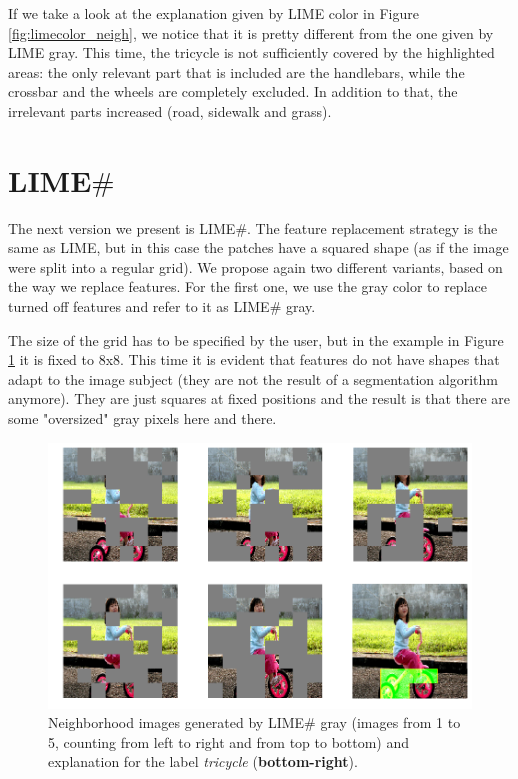 \documentclass[12pt, twoside, a4paper]{report}
\begin{document}

If we take a look at the explanation given by LIME color in Figure \ref{fig:limecolor_neigh}, we notice that it is pretty different from the one given by LIME gray. This time, the tricycle is not sufficiently covered by the highlighted areas: the only relevant part that is included are the handlebars, while the crossbar and the wheels are completely excluded. 
In addition to that, the irrelevant parts increased (road, sidewalk and grass). 



\section{LIME$\#$}

The next version we present is LIME\#. The feature replacement strategy is the same as LIME, but in this case the patches have a squared shape (as if the image were split into a regular grid). We propose again two different variants, based on the way we replace features. For the first one, we use the gray color to replace turned off features and refer to it as LIME\# gray. 

The size of the grid has to be specified by the user, but in the example in Figure \ref{fig:limesharp_neigh} it is fixed to 8x8. This time it is evident that features do not have shapes that adapt to the image subject (they are not the result of a segmentation algorithm anymore). They are just squares at fixed positions and the result is that there are some "oversized" gray pixels here and there.

\begin{figure}
\begin{center}
\includegraphics[width=.85\textwidth]{images/limesharp_neighborhood.png} 
\caption{Neighborhood images generated by LIME\# gray (images from 1 to 5, counting from left to right and from top to bottom) and explanation for the label \textit{tricycle} (\textbf{bottom-right}).}
\label{fig:limesharp_neigh}
\end{center}
\end{figure}
\end{document}
